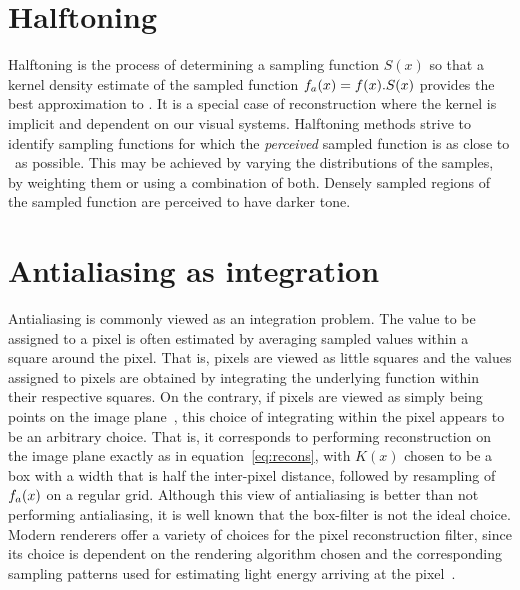 \documentclass[11pt,fleqn]{book} %
\newcommand{\TBC} {}
\begin{document}
\TBC

\section{Halftoning}
Halftoning is the process of determining a sampling function $S(x)$ so that a kernel density estimate of the sampled function ${f}_a(x) = f(x).S(x)$ provides the best approximation to \ifn. It is a special case of reconstruction where the kernel is implicit and dependent on our visual systems. Halftoning methods strive to identify sampling functions for which the \textit{perceived} sampled function is as close to \ifn\ as possible. This may be achieved by varying the distributions of the samples, by weighting them or using a combination of both. Densely sampled regions of the sampled function are perceived to have darker tone. 

\TBC

\section{Antialiasing as integration}
Antialiasing is commonly viewed as an integration problem. The value to be assigned to a pixel is often estimated by averaging sampled values within a square around the pixel. That is, pixels are viewed as little squares and the values assigned to pixels are obtained by integrating the underlying function within their respective squares. On the contrary, if pixels are viewed as simply being points on the image plane~\cite{smith1995pixel}, this choice of integrating within the pixel appears to be an arbitrary choice. That is, it corresponds to performing reconstruction on the image plane exactly as in equation~\ref{eq:recons}, with $K(x)$ chosen to be a box with a width that is half the inter-pixel distance, followed by resampling of ${f}_a(x)$ on a regular grid. Although this view of antialiasing is better than not performing antialiasing, it is well known that the box-filter is not the ideal choice. Modern renderers offer a variety of choices for the pixel reconstruction filter, since its choice is dependent on the rendering algorithm chosen and the corresponding sampling patterns used for estimating light energy arriving at the pixel~\cite[section~7.6]{Pharr:2010:PBR:1854996}.

\TBC
\end{document}
